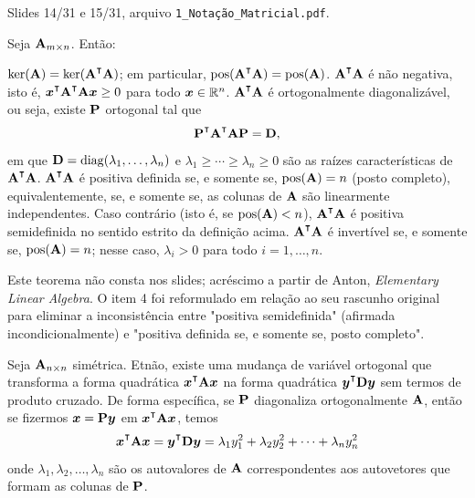 \begin{note}
	\leavevmode
	\begin{outline}[enumerate]
		\1 Slides 14/31 e 15/31, arquivo \texttt{1\_Notação\_Matricial.pdf}.
	\end{outline}
\end{note}

\begin{theorem}[Propriedades de $\m{A}\T\m{A}$]
	Seja $\mathbf{A}_{m\times n}$. Então:
	\begin{outline}[enumerate]
		\1 $\ker(\m{A}) = \ker(\m{A}\T\m{A})$; em particular, $\pos(\m{A}\T\m{A}) = \pos(\m{A})$.
		\1 $\m{A}\T\m{A}$ é não negativa, isto é, $\v{x}\T\m{A}\T\m{A}\v{x} \geq 0$ para todo $\bm{x}\in\mathbb{R}^n$.
		\1 $\m{A}\T\m{A}$ é ortogonalmente diagonalizável, ou seja, existe $\mathbf{P}$ ortogonal tal que
		\[
		\m{P}\T\m{A}\T\m{A}\m{P} = \m{D},
		\]
		em que $\mathbf{D} = \operatorname{diag}(\lambda_1,\ldots,\lambda_n)$ e $\lambda_1\geq\cdots\geq\lambda_n\geq0$ são as raízes características de $\m{A}\T\m{A}$.
		\1 $\m{A}\T\m{A}$ é positiva definida se, e somente se, $\operatorname{pos}(\mathbf{A}) = n$ (posto completo), equivalentemente, se, e somente se, as colunas de $\mathbf{A}$ são linearmente independentes. Caso contrário (isto é, se $\operatorname{pos}(\mathbf{A})<n$), $\m{A}\T\m{A}$ é positiva semidefinida no sentido estrito da definição acima.
		\1 $\m{A}\T\m{A}$ é invertível se, e somente se, $\operatorname{pos}(\mathbf{A}) = n$; nesse caso, $\lambda_i > 0$ para todo $i=1,\ldots,n$.
	\end{outline}
\end{theorem}

\begin{note}
	\leavevmode
	\begin{outline}[enumerate]
		\1 Este teorema não consta nos slides; acréscimo a partir de Anton, \textit{Elementary Linear Algebra}. O item 4 foi reformulado em relação ao seu rascunho original para eliminar a inconsistência entre "positiva semidefinida" (afirmada incondicionalmente) e "positiva definida se, e somente se, posto completo".
	\end{outline}
\end{note}


\begin{theorem}
	Seja $\mathbf{A}_{n \times n}$ simétrica. Etnão, existe uma mudança de variável ortogonal que transforma a forma quadrática $\v{x}\T \m A \v x$ na forma quadrática $\v y\T \m D \v y$ sem termos de produto cruzado. De forma específica, se $\mathbf{P}$ diagonaliza ortogonalmente $\mathbf{A}$, então se fizermos $\bm{x} = \mathbf{P} \bm{y}$ em $\v{x}\T \m A \v x$, temos
	\begin{equation}
		\v{x}\T \m A \v x = \v y\T \m D \v y = \lambda_1 y_1^2 + \lambda_2 y_2^2  + \cdots + \lambda_n y_n^2 
	\end{equation}
	onde $\lambda_1, \lambda_2, \ldots, \lambda_n$ são os autovalores de $\mathbf{A}$ correspondentes aos autovetores que formam as colunas de $\mathbf{P}$.
\end{theorem}


